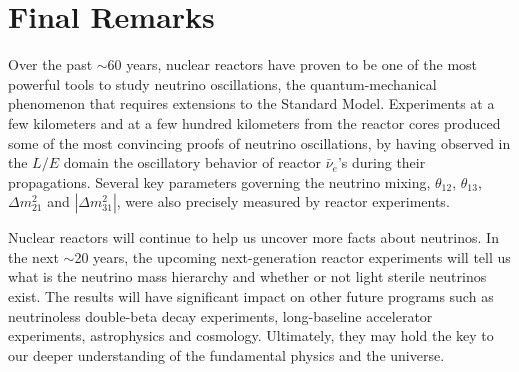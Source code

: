 \section{Final Remarks} 
\label{sec:prospects}

Over the past $\sim$60 years, nuclear reactors have proven to be one of the most powerful tools to study neutrino oscillations, the quantum-mechanical phenomenon that requires extensions to the Standard Model. Experiments at a few kilometers and at a few hundred kilometers from the reactor cores produced some of the most convincing proofs of neutrino oscillations, by having observed in the $L/E$ domain the oscillatory behavior of reactor $\bar\nu_e$'s during their propagations. Several key parameters governing the neutrino mixing, $\theta_{12}$, $\theta_{13}$, $\Delta{m}^2_{21}$ and $|\Delta{m}^2_{31}|$, were also precisely measured by reactor experiments. 

Nuclear reactors will continue to help us uncover more facts about neutrinos. In the next $\sim$20 years, the upcoming next-generation reactor experiments will tell us what is the neutrino mass hierarchy and whether or not light sterile neutrinos exist. The results will have significant impact on other future programs such as neutrinoless double-beta decay experiments, long-baseline accelerator experiments, astrophysics and cosmology. Ultimately, they may hold the key to our deeper understanding of the fundamental physics and the universe.


